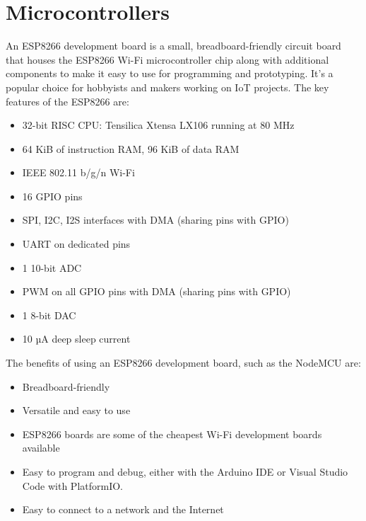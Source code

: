 \section{Microcontrollers}
\label{sec:microcontrollers}
An ESP8266 development board is a small, breadboard-friendly circuit board that houses the ESP8266 Wi-Fi microcontroller chip along with additional components to make 
it easy to use for programming and prototyping. It's a popular choice for hobbyists and makers working on \ac{IoT} projects.
The key features of the ESP8266 are:
\begin{itemize}
\item 32-bit \ac{RISC} \ac{CPU}: Tensilica Xtensa LX106 running at 80 MHz
\item 64 KiB of instruction \ac{RAM}, 96 KiB of data \ac{RAM}
\item \ac{IEEE} 802.11 b/g/n \ac{Wi-Fi}
\item 16 \ac{GPIO} pins
\item \ac{SPI}, \ac{I2C}, \ac{I2S} interfaces with \ac{DMA} (sharing pins with \ac{GPIO})
\item \ac{UART} on dedicated pins
\item 1 10-bit \ac{ADC}
\item \ac{PWM} on all \ac{GPIO} pins with \ac{DMA} (sharing pins with \ac{GPIO})
\item 1 8-bit \ac{DAC}
\item 10 µA deep sleep current
\end{itemize}
The benefits of using an ESP8266 development board, such as the NodeMCU are:
\begin{itemize}
\item Breadboard-friendly
\item Versatile and easy to use
\item ESP8266 boards are some of the cheapest \ac{Wi-Fi} development boards available
\item Easy to program and debug, either with the Arduino \ac{IDE} or Visual Studio Code with PlatformIO.
\item Easy to connect to a network and the Internet
\end{itemize}


